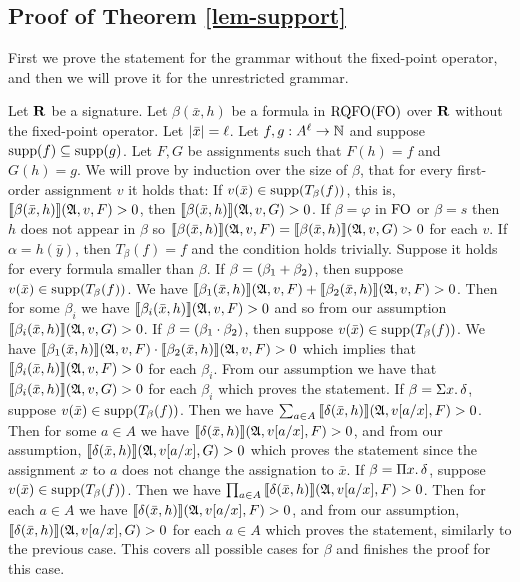 
\subsection*{Proof of Theorem \ref{lem-support}}

First we prove the statement for the grammar without the fixed-point operator, and then we will prove it for the unrestricted grammar.

Let $\mathbf{R}$ be a signature. Let $\beta(\bar{x},h)$ be a formula in ${\rm RQFO}({\rm FO})$ over $\mathbf{R}$ without the fixed-point operator. Let $\vert \bar{x} \vert = \ell$. Let $f,g :A^{\ell}\to\mathbb{N}$ and suppose $\text{\rm supp}(f) \subseteq \text{\rm supp}(g)$. Let $F,G$ be assignments such that $F(h) = f$ and $G(h) = g$. We will prove by induction over the size of $\beta$, that for every first-order assignment $v$ it holds that: If $v(\bar{x})\in\text{\rm supp}(T_{\beta}(f))$, this is, ${\llbracket{}{\beta(\bar{x},h)}\rrbracket}(\mathfrak{A},v,F) > 0$, then ${\llbracket{}{\beta(\bar{x},h)}\rrbracket}(\mathfrak{A},v,G) > 0$.
If $\beta = \varphi$ in ${\rm FO}$ or $\beta = s$ then $h$ does not appear in $\beta$ so ${\llbracket{}{\beta(\bar{x},h)}\rrbracket}(\mathfrak{A},v,F) = {\llbracket{}{\beta(\bar{x},h)}\rrbracket}(\mathfrak{A},v,G) > 0$ for each $v$. If $\alpha = h(\bar{y})$, then $T_{\beta}(f) = f$ and the condition holds trivially. Suppose it holds for every formula smaller than $\beta$. If $\beta = (\beta_1 + \beta_2)$, then suppose $v(\bar{x})\in\text{\rm supp}(T_{\beta}(f))$. We have ${\llbracket{}{\beta_1(\bar{x},h)}\rrbracket}(\mathfrak{A},v,F) + {\llbracket{}{\beta_2(\bar{x},h)}\rrbracket}(\mathfrak{A},v,F) > 0$. Then for some $\beta_i$ we have ${\llbracket{}{\beta_i(\bar{x},h)}\rrbracket}(\mathfrak{A},v,F) > 0$ and so from our assumption ${\llbracket{}{\beta_i(\bar{x},h)}\rrbracket}(\mathfrak{A},v,G) > 0$. 
If $\beta = (\beta_1 \cdot \beta_2)$, then suppose $v(\bar{x})\in\text{\rm supp}(T_{\beta}(f))$. We have ${\llbracket{}{\beta_1(\bar{x},h)}\rrbracket}(\mathfrak{A},v,F) \cdot {\llbracket{}{\beta_2(\bar{x},h)}\rrbracket}(\mathfrak{A},v,F) > 0$ which implies that ${\llbracket{}{\beta_i(\bar{x},h)}\rrbracket}(\mathfrak{A},v,F) > 0$ for each $\beta_i$. From our assumption we have that ${\llbracket{}{\beta_i(\bar{x},h)}\rrbracket}(\mathfrak{A},v,G) > 0$ for each $\beta_i$ which proves the statement. If $\beta = \Sigma{x}.\,\delta$, suppose $v(\bar{x})\in\text{\rm supp}(T_{\beta}(f))$. Then we have $\sum_{a\in A}{\llbracket{}{\delta(\bar{x},h)}\rrbracket}(\mathfrak{A},v[a/x],F) > 0$. Then for some $a\in A$ we have ${\llbracket{}{\delta(\bar{x},h)}\rrbracket}(\mathfrak{A},v[a/x],F) > 0$, and from our assumption, ${\llbracket{}{\delta(\bar{x},h)}\rrbracket}(\mathfrak{A},v[a/x],G) > 0$ which proves the statement since the assignment $x$ to $a$ does not change the assignation to $\bar{x}$. If $\beta = \Pi{x}.\,\delta$, suppose $v(\bar{x})\in\text{\rm supp}(T_{\beta}(f))$.
Then we have $\prod_{a\in A}{\llbracket{}{\delta(\bar{x},h)}\rrbracket}(\mathfrak{A},v[a/x],F) > 0$. Then for each $a\in A$ we have ${\llbracket{}{\delta(\bar{x},h)}\rrbracket}(\mathfrak{A},v[a/x],F) > 0$, and from our assumption, ${\llbracket{}{\delta(\bar{x},h)}\rrbracket}(\mathfrak{A},v[a/x],G) > 0$ for each $a\in A$ which proves the statement, similarly to the previous case. This covers all possible cases for $\beta$ and finishes the proof for this case.

